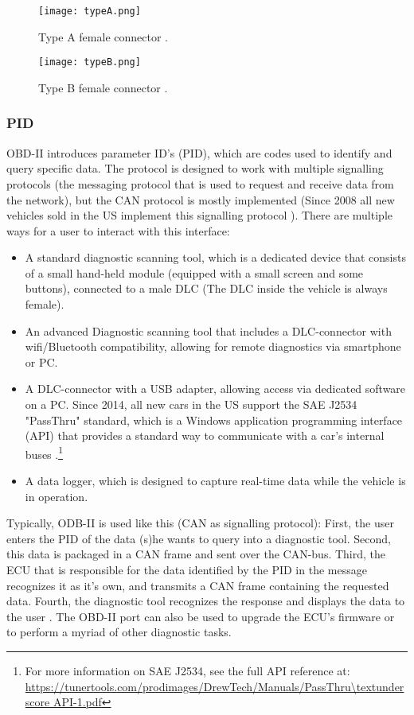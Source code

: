 \begin{figure}[h]
	\centering
	\texttt{[image: typeA.png]}
	\caption{Type A female connector \cite{wiki:OBD}.}
	\label{fig:typeA}
\end{figure}

\begin{figure}[h]
	\centering
	\texttt{[image: typeB.png]}
	\caption{Type B female connector \cite{wiki:OBD}.}
	\label{fig:typeB}
\end{figure}

\subsubsection{PID}
\label{subsec:obd:pid}

OBD-II introduces parameter ID's (PID), which are codes used to identify and query specific data. The protocol is designed to work with multiple signalling protocols (the messaging protocol that is used to request and receive data from the network), but the CAN protocol is mostly implemented (Since 2008 all new vehicles sold in the US implement this signalling protocol \cite{OBDconnector}). \newline
\newline
There are multiple ways for a user to interact with this interface:
\begin{itemize}
	\item A standard diagnostic scanning tool, which is a dedicated device that consists of a small hand-held module (equipped with a small screen and some buttons), connected to a male DLC (The DLC inside the vehicle is always female).
	
	\item An advanced Diagnostic scanning tool that includes a DLC-connector with wifi/Bluetooth compatibility, allowing for remote diagnostics via smartphone or PC.
	
	\item A DLC-connector with a USB adapter, allowing access via dedicated software on a PC. Since 2014, all new cars in the US support the SAE J2534 "PassThru" standard, which is a Windows application programming interface (API) that provides a standard way to communicate with a car's internal buses \cite{Kosher}.\footnote{For more information on SAE J2534, see the full API reference at: \url{https://tunertools.com/prodimages/DrewTech/Manuals/PassThru\textunderscore API-1.pdf}}
	
	\item A data logger, which is designed to capture real-time data while the vehicle is in operation.
\end{itemize}
Typically, ODB-II is used like this (CAN as signalling protocol): First, the user enters the PID of the data (s)he wants to query into a diagnostic tool. Second, this data is packaged in a CAN frame and sent over the CAN-bus. Third, the ECU that is responsible for the data identified by the PID in the message recognizes it as it's own, and transmits a CAN frame containing the requested data. Fourth, the diagnostic tool recognizes the response and displays the data to the user \cite{wiki:PID}. The OBD-II port can also be used to upgrade the ECU's firmware or to perform a myriad of other diagnostic tasks.

